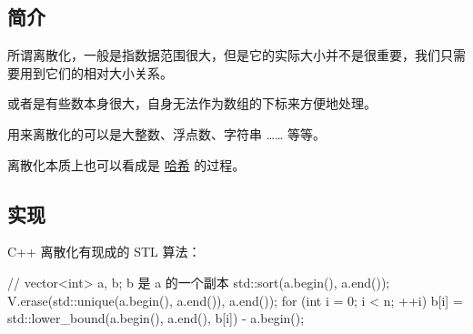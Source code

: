 
\subsection{简介}

所谓离散化，一般是指数据范围很大，但是它的实际大小并不是很重要，我们只需要用到它们的相对大小关系。

或者是有些数本身很大，自身无法作为数组的下标来方便地处理。

用来离散化的可以是大整数、浮点数、字符串 …… 等等。

离散化本质上也可以看成是 \href{/string/hash}{哈希} 的过程。

\subsection{实现}

C++ 离散化有现成的 STL 算法：

\begin{cppcode}
// vector<int> a, b; b 是 a 的一个副本
std::sort(a.begin(), a.end());
V.erase(std::unique(a.begin(), a.end()), a.end());
for (int i = 0; i < n; ++i)
  b[i] = std::lower_bound(a.begin(), a.end(), b[i]) - a.begin();
\end{cppcode}
